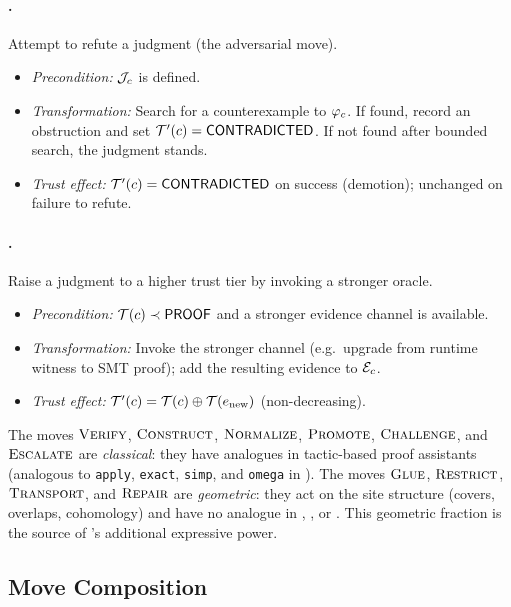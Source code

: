 \paragraph{\CHALLENGE.}
Attempt to refute a judgment (the adversarial move).
\begin{itemize}[nosep]
  \item \emph{Precondition:} $\mathcal{J}_c$ is defined.
  \item \emph{Transformation:}
        Search for a counterexample to $\varphi_c$.  If found, record
        an obstruction and set $\mathcal{T}'(c) = \mathsf{CONTRADICTED}$.  If not
        found after bounded search, the judgment stands.
  \item \emph{Trust effect:}
        $\mathcal{T}'(c) = \mathsf{CONTRADICTED}$ on success (demotion);
        unchanged on failure to refute.
\end{itemize}

\paragraph{\ESCALATE.}
Raise a judgment to a higher trust tier by invoking a stronger oracle.
\begin{itemize}[nosep]
  \item \emph{Precondition:}
        $\mathcal{T}(c) \prec \mathsf{PROOF}$ and a stronger evidence channel
        is available.
  \item \emph{Transformation:}
        Invoke the stronger channel (e.g.\ upgrade from runtime
        witness to SMT proof); add the resulting evidence to
        $\mathcal{E}_c$.
  \item \emph{Trust effect:}
        $\mathcal{T}'(c) = \mathcal{T}(c) \oplus \mathcal{T}(e_{\mathrm{new}})$
        (non-decreasing).
\end{itemize}

\begin{remark}\label{rem:class-geo}
The moves $\textsc{Verify}$, $\textsc{Construct}$, $\textsc{Normalize}$, $\textsc{Promote}$,
$\textsc{Challenge}$, and $\textsc{Escalate}$ are \emph{classical}: they have
analogues in tactic-based proof assistants (analogous to
\texttt{apply}, \texttt{exact}, \texttt{simp}, and
\texttt{omega} in \LEAN).  The moves $\textsc{Glue}$, $\textsc{Restrict}$,
$\textsc{Transport}$, and $\textsc{Repair}$ are \emph{geometric}: they act on
the site structure (covers, overlaps, cohomology) and have no
analogue in \LEAN, \Coq, or \Fstar.  This geometric fraction is
the source of \JuGeo's additional expressive power.
\end{remark}

\subsection{Move Composition}\label{sec:move-composition}

